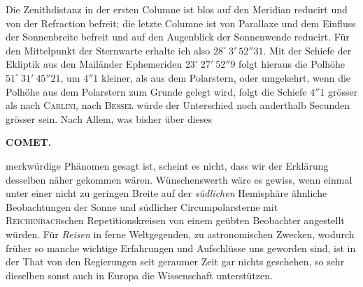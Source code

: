 \par\indent Die Zenithdistanz in der ersten Columne ist blos auf den Meridian reducirt und von der
Refraction befreit; die letzte Columne ist von Parallaxe und dem Einfluss der Sonnenbreite
befreit und auf den Augenblick der Sonnenwende reducirt. Für den Mittelpunkt der Sternwarte
erhalte ich also $28^\circ\ 3'\ 52''31$. Mit der Schiefe der Ekliptik aus den Mailänder
Ephemeriden $23^\circ\ 27'\ 52''9$ folgt hieraus die Polhöhe $51^\circ\ 31'\ 45''21$, um $4''1$
kleiner, als aus dem Polarstern, oder umgekehrt, wenn die Polhöhe aus dem Polarstern zum Grunde
gelegt wird, folgt die Schiefe $4''1$ grösser als nach \textsc{Carlini}, nach \textsc{Bessel}
würde der Unterschied noch anderthalb Secunden grösser sein. Nach Allem, was bisher über dieses\par
{}
\clearpage
\thispagestyle{empty}
\noindent{}%
%
\parbox[t]{\dimexpr\linewidth-24mm\relax}{\centering\footnotesize\bfseries COMET.\par}%
\makebox[12mm][r]{}\par\nobreak\medskip
\noindent merkwürdige Phänomen gesagt ist, scheint es nicht, dass wir der Erklärung
desselben näher gekommen wären. Wünschenswerth wäre es gewiss, wenn einmal
unter einer nicht zu geringen Breite auf der \emph{südlichen} Hemisphäre
ähnliche Beobachtungen der Sonne und südlicher Circumpolarsterne mit
\textsc{Reichenbach}schen Repetitionskreisen von einem geübten Beobachter
angestellt würden. Für \emph{Reisen} in ferne Weltgegenden, zu astronomischen
Zwecken, wodurch früher so manche wichtige Erfahrungen und Aufschlüsse uns
geworden sind, ist in der That von den Regierungen seit geraumer Zeit gar
nichts geschehen, so sehr dieselben sonst auch in Europa die Wissenschaft
unterstützen.

